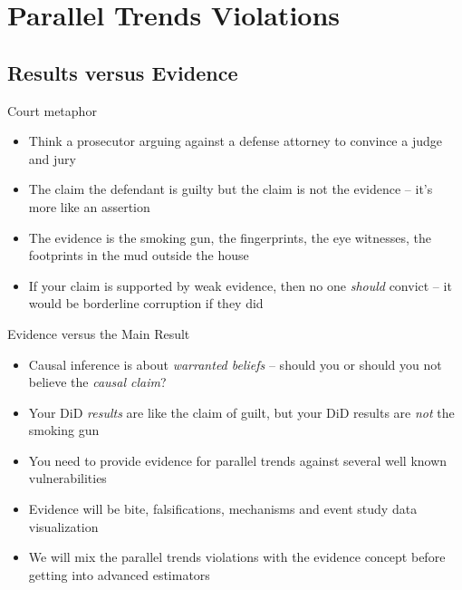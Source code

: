 \documentclass{beamer}
\begin{document}
\section{Parallel Trends Violations}

\subsection{Results versus Evidence}

\begin{frame}{Court metaphor}

	\begin{itemize}
	\item Think a prosecutor arguing against a defense attorney to convince a judge and jury
	\item The claim the defendant is guilty but the claim is not the evidence -- it's more like an assertion
	\item The evidence is the smoking gun, the fingerprints, the eye witnesses, the footprints in the mud outside the house
	\item If your claim is supported by weak evidence, then no one \emph{should} convict -- it would be borderline corruption if they did 
	\end{itemize}

\end{frame}


\begin{frame}{Evidence versus the Main Result}

\begin{itemize}
\item Causal inference is about \emph{warranted beliefs} -- should you or should you not believe the \emph{causal claim}?
\item Your DiD \emph{results} are like the claim of guilt, but your DiD results are \emph{not} the smoking gun
\item You need to provide evidence for parallel trends against several well known vulnerabilities
\item Evidence will be bite, falsifications, mechanisms and event study data visualization 
\item We will mix the parallel trends violations with the evidence concept before getting into advanced estimators
\end{itemize}

\end{frame}
\end{document}
